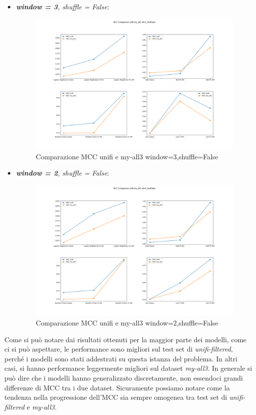 \begin{itemize}
    \newpage
    \item \textit{\textbf{window = 3}, shuffle = False}:
    \begin{figure}[H]
    \centering
    \includegraphics[width=0.94\linewidth]{MCC Comparison Uni-All3 win3_shufFalse.png}
    \caption{Comparazione MCC unifi e my-all3 window=3,shuffle=False}
    \label{fig:enter-label}
    \end{figure}

    \item \textit{\textbf{window = 2}, shuffle = False}:
    \begin{figure}[H]
    \centering
    \includegraphics[width=0.94\linewidth]{MCC Comparison Uni-All3 win4_shufFalse.png}
    \caption{Comparazione MCC unifi e my-all3 window=2,shuffle=False}
    \label{fig:enter-label}
    \end{figure}
\end{itemize}

\newpage
Come si pu\`o notare dai risultati ottenuti per la maggior parte dei modelli, come ci si pu\`o aspettare, le performance sono migliori sul test set di \textit{unifi-filtered}, perch\'e i modelli sono stati addestrati su questa istanza del problema. In altri casi, si hanno performance leggermente migliori sul dataset \textit{my-all3}. In generale si pu\`o dire che i modelli hanno generalizzato discretamente, non essendoci grandi differenze di MCC tra i due dataset. Sicuramente possiamo notare come la tendenza nella progressione dell'MCC sia sempre omogenea tra test set di \textit{unifi-filtered} e \textit{my-all3}.

